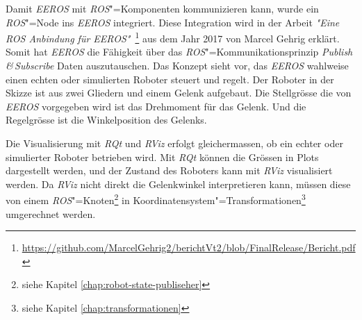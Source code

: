 Damit \textit{EEROS} mit \textit{ROS}"=Komponenten kommunizieren kann, wurde ein \textit{ROS}"=Node ins \textit{EEROS} integriert.
Diese Integration wird in der Arbeit \textit{\textit{"}Eine ROS Anbindung für EEROS\textit{"}}~\footnote{\url{https://github.com/MarcelGehrig2/berichtVt2/blob/FinalRelease/Bericht.pdf}} aus dem Jahr 2017 von Marcel Gehrig erklärt. 
Somit hat \textit{EEROS} die Fähigkeit über das \textit{ROS}"=Kommunikationsprinzip \textit{Publish\,\&\,Subscribe} Daten auszutauschen.
Das Konzept sieht vor, das \textit{EEROS} wahlweise einen echten oder simulierten Roboter steuert und regelt.
Der Roboter in der Skizze ist aus zwei Gliedern und einem Gelenk aufgebaut.
Die Stellgrösse die von \textit{EEROS} vorgegeben wird ist das Drehmoment für das Gelenk.
Und die Regelgrösse ist die Winkelposition des Gelenks.

Die Visualisierung mit \textit{RQt} und \textit{RViz} erfolgt gleichermassen, ob ein echter oder simulierter Roboter betrieben wird.
Mit \textit{RQt} können die Grössen in Plots dargestellt werden, und der Zustand des Roboters kann mit \textit{RViz} visualisiert werden.
Da \textit{RViz} nicht direkt die Gelenkwinkel interpretieren kann, müssen diese von einem \textit{ROS}"=Knoten\footnote{siehe Kapitel \ref{chap:robot-state-publiseher}} in Koordinatensystem"=Transformationen\footnote{siehe Kapitel \ref{chap:transformationen}} umgerechnet werden.






